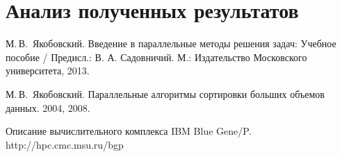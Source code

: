 \documentclass[oneside,final,14pt]{extreport}
\begin{document}
\chapter*{Анализ полученных результатов}

\begin{thebibliography}{0}
        М.\,В.~Якобовский.
        Введение в параллельные методы решения задач: Учебное пособие / Предисл.: В. А. Садовничий.
        М.: Издательство Московского университета, 2013.

        М.\,В.~Якобовский.
        Параллельные алгоритмы сортировки больших объемов данных.
        2004, 2008.

        Описание вычислительного комплекса IBM Blue Gene/P.
        http://hpc.cmc.msu.ru/bgp
\end{thebibliography}

\newpage
\appendix
\end{document}
